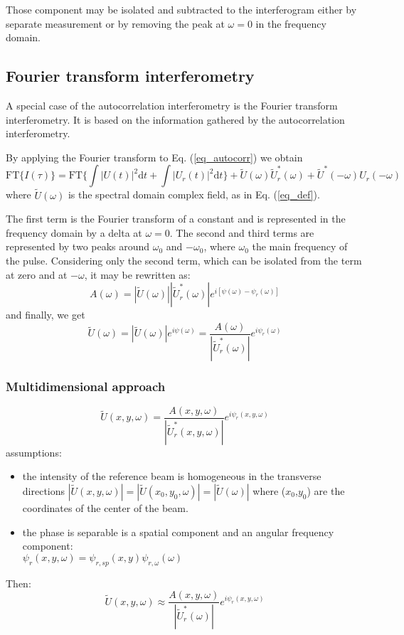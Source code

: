 \documentclass[12pt,a4paper,twoside]{article}
\begin{document}
Those component may be isolated and subtracted to the interferogram either by separate measurement or by removing the peak at $\omega = 0$ in the frequency domain.
\subsection{Fourier transform interferometry}
A special case of the autocorrelation interferometry is the Fourier transform interferometry.
It is based on the information gathered by the autocorrelation interferometry.

By applying the Fourier transform to Eq. (\ref{eq_autocorr}) we obtain
\begin{equation}
	\mathrm{FT}\lbrace I(\tau)\rbrace =
	\mathrm{FT}\lbrace\int|U(t)|^2\mathrm{d}t + \int|U_r(t)|^2\mathrm{d}t\rbrace
	+ \tilde{U}(\omega)\tilde{U}_r^*(\omega)
	+ \tilde{U}^*(-\omega)U_r(-\omega)
\end{equation}
where $\tilde{U}(\omega)$ is the spectral domain complex field, as in Eq. (\ref{eq_def}).

The first term is the Fourier transform of a constant and is represented in the frequency domain by a delta at $\omega = 0$.
The second and third terms are represented by two peaks around $\omega_0$ and $-\omega_0$, where $\omega_0$ the main frequency of the pulse.
Considering only the second term, which can be isolated from the term at zero and at $-\omega$, it may be rewritten as:
\begin{equation}
	A(\omega)=|\tilde{U}(\omega)||\tilde{U}_r^*(\omega)|e^{i[\psi(\omega)-\psi_r(\omega)]}
\end{equation}
and finally, we get
\begin{equation}
	\tilde{U}(\omega) = |\tilde{U}(\omega)|e^{i\psi(\omega)} = \frac{A(\omega)}{|\tilde{U}_r^*(\omega)|}e^{i\psi_r(\omega)}
\end{equation}

\subsubsection{Multidimensional approach}
\begin{equation}
	\tilde{U}(x,y,\omega) = \frac{A(x,y,\omega)}{|\tilde{U}_r^*(x,y,\omega)|}e^{i\psi_r(x,y,\omega)}
\end{equation}
assumptions:
\begin{itemize}
\item the intensity of the reference beam is homogeneous in the transverse directions $|\tilde{U}(x,y,\omega)|=|\tilde{U}(x_0,y_0,\omega)|=|\tilde{U}(\omega)|$ where ($x_0$,$y_0$) are the coordinates of the center of the beam.
\item the phase is separable is a spatial component and an angular frequency component:\\ $\psi_r(x,y,\omega) = \psi_{r,sp}(x,y)\psi_{r,\omega}(\omega)$
\end{itemize}
Then:
\begin{equation}
	\tilde{U}(x,y,\omega) \approx \frac{A(x,y,\omega)}{|\tilde{U}_r^*(\omega)|}e^{i\psi_r(x,y,\omega)}
\end{equation}
\end{document}
